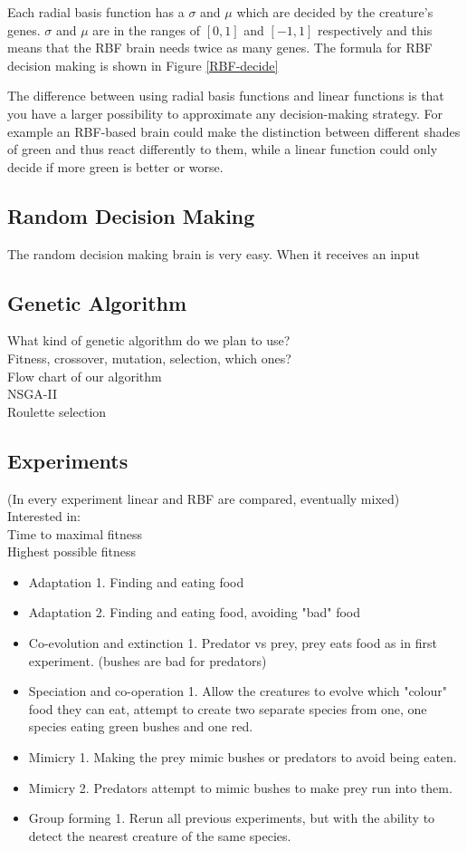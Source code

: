 \documentclass[a4paper,11pt]{kth-mag}
\begin{document}
Each radial basis function has a $\sigma$ and $\mu$ which are decided by the creature's genes. $\sigma$ and $\mu$ are in the ranges of $[0,1]$ and $[-1,1]$ respectively and this means that the RBF brain needs twice as many genes. The formula for RBF decision making is shown in Figure \ref{RBF-decide}

The difference between using radial basis functions and linear functions is that you have a larger possibility to approximate any decision-making strategy. For example an RBF-based brain could make the distinction between different shades of green and thus react differently to them, while a linear function could only decide if more green is better or worse.
\subsection{Random Decision Making}
The random decision making brain is very easy. When it receives an input 


\subsection{Genetic Algorithm}
What kind of genetic algorithm do we plan to use?\\
Fitness, crossover, mutation, selection, which ones?\\
Flow chart of our algorithm\\
NSGA-II\\
Roulette selection\\

\subsection{Experiments}
(In every experiment linear and RBF are compared, eventually mixed)\\
Interested in:\\
Time to maximal fitness\\
Highest possible fitness\\
\begin{itemize}
\item Adaptation 1. Finding and eating food
\item Adaptation 2. Finding and eating food, avoiding "bad" food
\item Co-evolution and extinction 1. Predator vs prey, prey eats food as in first experiment. (bushes are bad for predators)
\item Speciation and co-operation 1. Allow the creatures to evolve which "colour" food they can eat, attempt to create two separate species from one, one species eating green bushes and one red.
\item Mimicry 1. Making the prey mimic bushes or predators to avoid being eaten.
\item Mimicry 2. Predators attempt to mimic bushes to make prey run into them.
\item Group forming 1. Rerun all previous experiments, but with the ability to detect the nearest creature of the same species.
\end{itemize}
\end{document}
